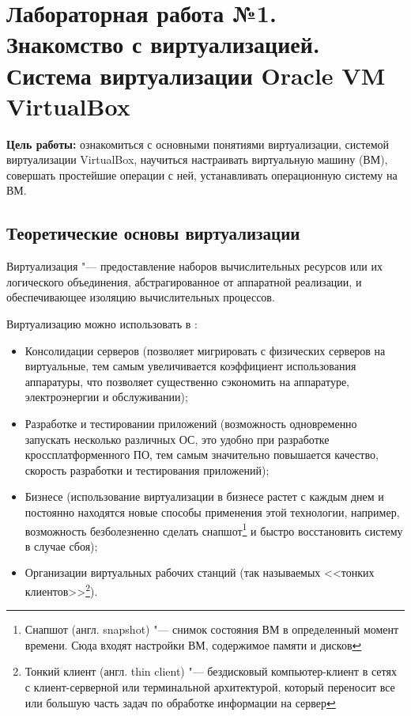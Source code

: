 \section[Лабораторная работа №1]{Лабораторная работа №1. \\
Знакомство с виртуализацией. Система виртуализации Oracle VM VirtualBox}

\textbf{Цель работы:} ознакомиться с основными понятиями виртуализации, системой виртуализации VirtualBox, научиться настраивать виртуальную машину (ВМ), совершать простейшие операции с ней, устанавливать операционную систему на ВМ.

\subsection{Теоретические основы виртуализации}

Виртуализация "--- предоставление наборов вычислительных ресурсов или их логического объединения, абстрагированное от аппаратной реализации, и обеспечивающее изоляцию вычислительных процессов. 

Виртуализацию можно использовать в \cite{sevconf2014}:
\begin{itemize}
    \item Консолидации серверов (позволяет мигрировать с физических серверов на виртуальные, тем самым увеличивается коэффициент использования аппаратуры, что позволяет существенно сэкономить на аппаратуре, электроэнергии и обслуживании);
    \item Разработке и тестировании приложений (возможность одновременно запускать несколько различных ОС, это удобно при разработке кроссплатформенного ПО, тем самым значительно повышается качество, скорость разработки и тестирования приложений);
    \item Бизнесе (использование виртуализации в бизнесе растет с каждым днем и постоянно находятся новые способы применения этой технологии, например, возможность безболезненно сделать снапшот\footnote{Снапшот (англ. snapshot) "--- снимок состояния ВМ в определенный момент времени. Сюда входят настройки ВМ, содержимое памяти и дисков} и быстро восстановить систему в случае сбоя);
    \item Организации виртуальных рабочих станций (так называемых <<тонких клиентов>>\footnote{Тонкий клиент (англ. thin client) "--- бездисковый компьютер-клиент в сетях с клиент-серверной или терминальной архитектурой, который переносит все или большую часть задач по обработке информации на сервер}).
\end{itemize}

